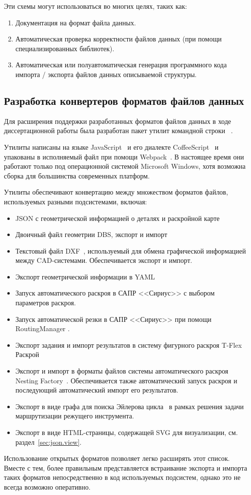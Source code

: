 Эти схемы могут использоваться во многих целях, таких как:

\begin{enumerate}
  \item Документация на формат файла данных.
  \item Автоматическая проверка корректности файлов данных
  (при помощи специализированных библиотек).
  \item Автоматическая или полуавтоматическая генерация
  программного кода импорта / экспорта файлов данных
  описываемой структуры.
\end{enumerate}

\subsection{%
Разработка конвертеров форматов файлов данных
}
\label{sec:json-dbs.js}

Для расширения поддержки разработанных форматов файлов данных
в ходе диссертационной работы
была разработан пакет утилит командной строки~
\cite{bi:dbs2json}.

Утилиты написаны на языке
JavaScript~\cite{bi:JavaScript}
и его диалекте
CoffeeScript~\cite{bi:CoffeeScript}
и упакованы в исполняемый файл при помощи
Webpack~\cite{bi:webpack}.
В настоящее время они работают только под
операционной системой Microsoft Windows,
хотя возможна сборка для большинства современных платформ.

Утилиты обеспечивают конвертацию между множеством
форматов файлов,
используемых разными подсистемами,
включая:
\begin{itemize}
  \item JSON с геометрической информацией о деталях и раскройной карте
  \item Двоичный файл геометрии DBS, экспорт и импорт
  \item Текстовый файл DXF~\cite{bi:DXF},
  используемый для обмена графической информацией между CAD-системами.
  Обеспечивается экспорт и импорт.
  \item Экспорт геометрической информации в YAML~\cite{bi:YAML}
  \item Запуск автоматического раскроя в САПР <<Сириус>>
  с выбором параметров раскроя.
  \item Запуск автоматической резки в САПР <<Сириус>>
  при помощи RoutingManager
  \cite{bi:greedy,bi:RoMa}.
  \item Экспорт задания и импорт результатов
  в систему фигурного раскроя T-Flex Раскрой~\cite{bi:T-Flex}
  \item Экспорт и импорт в форматы файлов системы автоматического раскроя
  Nesting Factory~\cite{bi:Algomate}.
  Обеспечивается также автоматический запуск раскроя
  и последующий автоматический импорт его результатов.
  \item Экспорт в виде графа для поиска
  Эйлерова цикла~\cite{bi:Makarovskikh2019Jan,Makarovskikh20181171,bi:Makarovskikh2019Other}
  в рамках решения задачи маршрутизации режущего инструмента.
  \item Экспорт в виде HTML-страницы,
  содержащей SVG
  для визуализации,
  см. раздел~\ref{sec:json.view}.
\end{itemize}

Использование открытых форматов позволяет
легко расширять этот список.
Вместе с тем,
более правильным представляется
встраивание экспорта и импорта таких форматов
непосредственно в код используемых подсистем,
однако это не всегда возможно оперативно.
